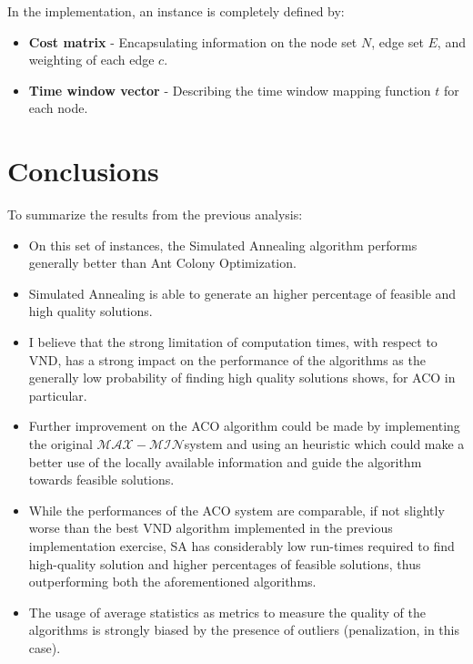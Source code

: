 \documentclass{article}
\newcommand{\maxmin}{$\mathcal{MAX}-\mathcal{MIN}$}
\begin{document}
In the implementation, an instance is completely defined by:
\begin{itemize}
\item \textbf{Cost matrix} - Encapsulating information on the node set $N$, edge set $E$, and weighting of each edge $c$.
\item \textbf{Time window vector} - Describing the time window mapping function $t$ for each node.
\end{itemize}







\section{Conclusions}
To summarize the results from the previous analysis:
\begin{itemize}
      \item On this set of instances, the Simulated Annealing algorithm performs generally better than Ant Colony Optimization.
    \item Simulated Annealing is able to generate an higher percentage of feasible and high quality solutions. 
  \item I believe that the strong limitation of computation times, with respect to VND, has a strong impact on the performance of the algorithms as the generally low probability of finding high quality solutions shows, for ACO in particular.
  \item Further improvement on the ACO algorithm could be made by implementing the original \maxmin system and using an heuristic which could make a better use of the locally available information and guide the algorithm towards feasible solutions.
  \item While the performances of the ACO system are comparable, if not slightly worse than the best VND algorithm implemented in the previous implementation exercise, SA has considerably low run-times required to find high-quality solution and higher percentages of feasible solutions, thus outperforming both the aforementioned algorithms.
  \item The usage of average statistics as metrics to measure the quality of the algorithms is strongly biased by the presence of outliers (penalization, in this case).
\end{itemize}





\end{document}
